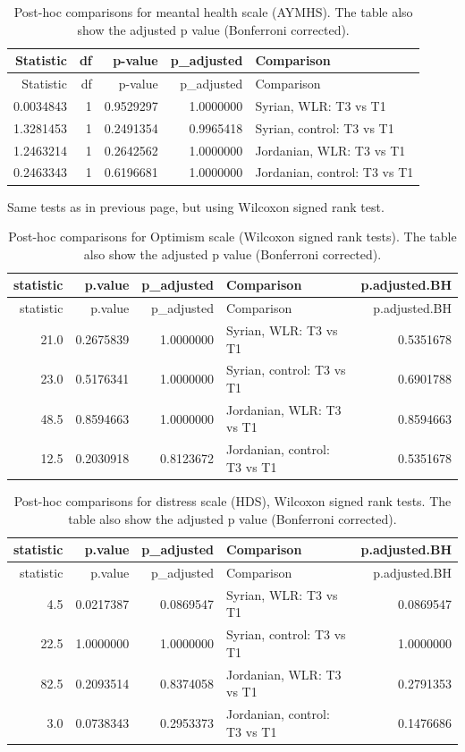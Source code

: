 \documentclass[]{article}
\begin{document}
\begin{longtable}[]{@{}rrrrl@{}}
\caption{Post-hoc comparisons for meantal health scale (AYMHS). The
table also show the adjusted p value (Bonferroni
corrected).}\tabularnewline
\toprule
Statistic & df & p-value & p\_adjusted & Comparison\tabularnewline
\midrule
\endfirsthead
\toprule
Statistic & df & p-value & p\_adjusted & Comparison\tabularnewline
\midrule
\endhead
0.0034843 & 1 & 0.9529297 & 1.0000000 & Syrian, WLR: T3 vs
T1\tabularnewline
1.3281453 & 1 & 0.2491354 & 0.9965418 & Syrian, control: T3 vs
T1\tabularnewline
1.2463214 & 1 & 0.2642562 & 1.0000000 & Jordanian, WLR: T3 vs
T1\tabularnewline
0.2463343 & 1 & 0.6196681 & 1.0000000 & Jordanian, control: T3 vs
T1\tabularnewline
\bottomrule
\end{longtable}

\newpage

Same tests as in previous page, but using Wilcoxon signed rank test.

\begin{longtable}[]{@{}rrrlr@{}}
\caption{Post-hoc comparisons for Optimism scale (Wilcoxon signed rank
tests). The table also show the adjusted p value (Bonferroni
corrected).}\tabularnewline
\toprule
statistic & p.value & p\_adjusted & Comparison &
p.adjusted.BH\tabularnewline
\midrule
\endfirsthead
\toprule
statistic & p.value & p\_adjusted & Comparison &
p.adjusted.BH\tabularnewline
\midrule
\endhead
21.0 & 0.2675839 & 1.0000000 & Syrian, WLR: T3 vs T1 &
0.5351678\tabularnewline
23.0 & 0.5176341 & 1.0000000 & Syrian, control: T3 vs T1 &
0.6901788\tabularnewline
48.5 & 0.8594663 & 1.0000000 & Jordanian, WLR: T3 vs T1 &
0.8594663\tabularnewline
12.5 & 0.2030918 & 0.8123672 & Jordanian, control: T3 vs T1 &
0.5351678\tabularnewline
\bottomrule
\end{longtable}

\begin{longtable}[]{@{}rrrlr@{}}
\caption{Post-hoc comparisons for distress scale (HDS), Wilcoxon signed
rank tests. The table also show the adjusted p value (Bonferroni
corrected).}\tabularnewline
\toprule
statistic & p.value & p\_adjusted & Comparison &
p.adjusted.BH\tabularnewline
\midrule
\endfirsthead
\toprule
statistic & p.value & p\_adjusted & Comparison &
p.adjusted.BH\tabularnewline
\midrule
\endhead
4.5 & 0.0217387 & 0.0869547 & Syrian, WLR: T3 vs T1 &
0.0869547\tabularnewline
22.5 & 1.0000000 & 1.0000000 & Syrian, control: T3 vs T1 &
1.0000000\tabularnewline
82.5 & 0.2093514 & 0.8374058 & Jordanian, WLR: T3 vs T1 &
0.2791353\tabularnewline
3.0 & 0.0738343 & 0.2953373 & Jordanian, control: T3 vs T1 &
0.1476686\tabularnewline
\bottomrule
\end{longtable}
\end{document}
